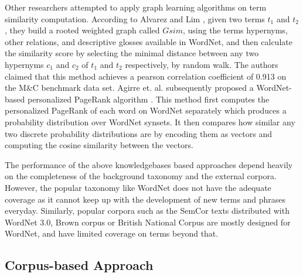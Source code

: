 Other researchers attempted to apply graph learning algorithms on
term similarity computation.
According to Alvarez and Lim \cite{Alvarez:2007}, given two terms $t_1$ and $t_2$, they build a rooted weighted graph called $Gsim$,
using the terms hypernyms, other relations, and descriptive glosses available
in WordNet, and then calculate the similarity score by
selecting the minimal distance between any two hypernyms $c_1$ and $c_2$
of $t_1$ and $t_2$ respectively, by random walk.
The authors claimed that this method achieves a pearson correlation coefficient
of 0.913 on the M\&C benchmark data set\cite{Miller:1998}.
Agirre et. al. subsequently proposed a WordNet-based personalized PageRank algorithm \cite{Soroa:2009}\cite{Agirre:2010}.
This method first computes the personalized PageRank of each word on WordNet separately
which produces a probability distribution over WordNet synsets.
It then compares how similar any two discrete probability distributions are
by encoding them as vectors and computing the cosine similarity between the vectors.

The performance of the above knowledgebases based approaches depend heavily on the completeness of the background taxonomy and the external
corpora.
However, the popular taxonomy like WordNet does not have the adequate coverage
as it cannot keep up with the development of new terms and phrases everyday.
Similarly, popular corpora such as the SemCor\cite{semcor} texts distributed with WordNet 3.0,
Brown corpus\cite{Brown} or British National Corpus\cite{BNC} are mostly designed for WordNet,
and have limited coverage on terms beyond that.

\subsection{Corpus-based Approach}

